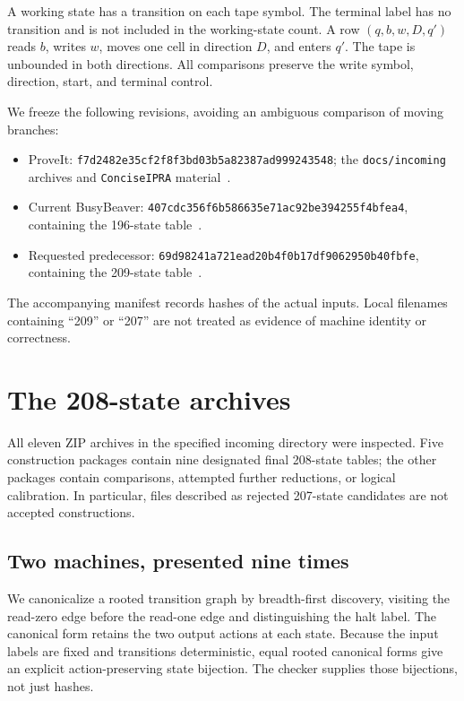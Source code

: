 \documentclass[11pt,letterpaper]{article}
\newcommand{\file}[1]{\texttt{\nolinkurl{#1}}}
\begin{document}
A working state has a transition on each tape symbol. The terminal label
has no transition and is not included in the working-state count. A row
$(q,b,w,D,q')$ reads $b$, writes $w$, moves one cell in direction $D$, and
enters $q'$. The tape is unbounded in both directions. All comparisons
preserve the write symbol, direction, start, and terminal control.

We freeze the following revisions, avoiding an ambiguous comparison of
moving branches:
\begin{itemize}
\item ProveIt: \file{f7d2482e35cf2f8f3bd03b5a82387ad999243548}; the
  \file{docs/incoming} archives and \file{ConciseIPRA} material~\cite{proveit,ipra}.
\item Current BusyBeaver: \file{407cdc356f6b586635e71ac92be394255f4bfea4},
  containing the 196-state table~\cite{pa196}.
\item Requested predecessor: \file{69d98241a721ead20b4f0b17df9062950b40fbfe},
  containing the 209-state table~\cite{pa209}.
\end{itemize}
The accompanying manifest records hashes of the actual inputs. Local
filenames containing ``209'' or ``207'' are not treated as evidence of
machine identity or correctness.

\section{The 208-state archives}
\label{sec:208}

All eleven ZIP archives in the specified incoming directory were inspected.
Five construction packages contain nine designated final 208-state tables;
the other packages contain comparisons, attempted further reductions, or
logical calibration. In particular, files described as rejected 207-state
candidates are not accepted constructions.

\subsection{Two machines, presented nine times}

We canonicalize a rooted transition graph by breadth-first discovery,
visiting the read-zero edge before the read-one edge and distinguishing
the halt label. The canonical form retains the two output actions at each
state. Because the input labels are fixed and transitions deterministic,
equal rooted canonical forms give an explicit action-preserving state
bijection. The checker supplies those bijections, not just hashes.
\end{document}

